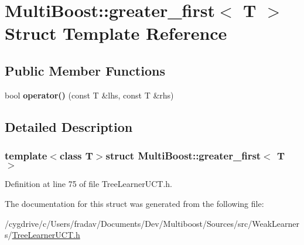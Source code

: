 \hypertarget{structMultiBoost_1_1greater__first}{
\section{MultiBoost::greater\_\-first$<$ T $>$ Struct Template Reference}
\label{structMultiBoost_1_1greater__first}
}
\subsection*{Public Member Functions}
\begin{DoxyCompactItemize}
\item 
\hypertarget{structMultiBoost_1_1greater__first_a5e261c5c5b5808bcd74d1d88962fde12}{
bool {\bfseries operator()} (const T \&lhs, const T \&rhs)}
\label{structMultiBoost_1_1greater__first_a5e261c5c5b5808bcd74d1d88962fde12}

\end{DoxyCompactItemize}


\subsection{Detailed Description}
\subsubsection*{template$<$class T$>$struct MultiBoost::greater\_\-first$<$ T $>$}



Definition at line 75 of file TreeLearnerUCT.h.



The documentation for this struct was generated from the following file:\begin{DoxyCompactItemize}
\item 
/cygdrive/c/Users/fradav/Documents/Dev/Multiboost/Sources/src/WeakLearners/\hyperlink{TreeLearnerUCT_8h}{TreeLearnerUCT.h}\end{DoxyCompactItemize}
